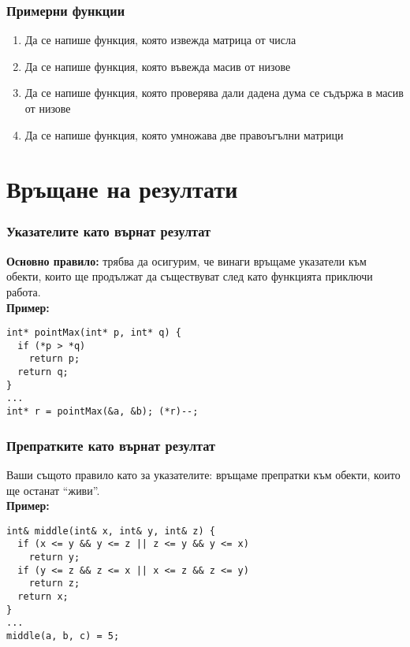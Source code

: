 \documentclass[alsotrans]{beamerswitch}
\begin{document}
\begin{frame}
  \frametitle{Примерни функции}

  \begin{enumerate}[<+->]
  \item Да се напише функция, която извежда матрица от числа
  \item Да се напише функция, която въвежда масив от низове
  \item Да се напише функция, която проверява дали дадена дума се съдържа в масив от низове
  \item Да се напише функция, която умножава две правоъгълни матрици
  \end{enumerate}
\end{frame}

\section{Връщане на резултати}

\begin{frame}[fragile]
  \frametitle{Указателите като върнат резултат}

  \textbf{Основно правило:} трябва да осигурим, че винаги връщаме указатели към обекти, които ще продължат да съществуват след като функцията приключи работа.\\[4ex]
  \pause
  \textbf{Пример:}
\begin{lstlisting}
int* pointMax(int* p, int* q) {
  if (*p > *q)
    return p;
  return q;
}
...
int* r = pointMax(&a, &b); (*r)--;
\end{lstlisting}
\end{frame}

\begin{frame}[fragile]
  \frametitle{Препратките като върнат резултат}

  Ваши същото правило като за указателите: връщаме препратки към обекти, които ще останат ``живи''.\\[4ex]
  \pause
  \textbf{Пример:}
\begin{lstlisting}
int& middle(int& x, int& y, int& z) {
  if (x <= y && y <= z || z <= y && y <= x)
    return y;
  if (y <= z && z <= x || x <= z && z <= y)
    return z;
  return x;
}
...
middle(a, b, c) = 5;
\end{lstlisting}
\end{frame}
\end{document}
